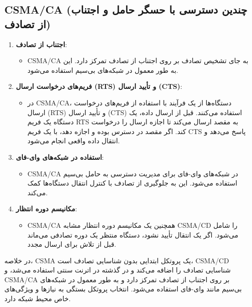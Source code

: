\subsection*{CSMA/CA (چندین دسترسی با حسگر حامل و اجتناب از تصادف)}

\begin{enumerate}
    \item \textbf{اجتناب از تصادف}:
    \begin{itemize}
        \item CSMA/CA به جای تشخیص تصادف بر روی اجتناب از تصادف تمرکز دارد. این به طور معمول در شبکه‌های بی‌سیم استفاده می‌شود.
    \end{itemize}
    
    \item \textbf{فریم‌های درخواست ارسال (RTS) و تأیید ارسال (CTS)}:
    \begin{itemize}
        \item در CSMA/CA، دستگاه‌ها از یک فرآیند با استفاده از فریم‌های درخواست ارسال (RTS) و تأیید ارسال (CTS) استفاده می‌کنند. قبل از ارسال داده، یک دستگاه یک فریم RTS به مقصد ارسال می‌کند تا اجازه ارسال را درخواست کند. اگر مقصد در دسترس بوده و اجازه دهد، با یک فریم CTS پاسخ می‌دهد و انتقال داده واقعی انجام می‌شود.
    \end{itemize}
    
    \item \textbf{استفاده در شبکه‌های وای-فای}:
    \begin{itemize}
        \item CSMA/CA در شبکه‌های وای-فای برای مدیریت دسترسی به حامل بی‌سیم استفاده می‌شود. این به جلوگیری از تصادف با کنترل انتقال دستگاه‌ها کمک می‌کند.
    \end{itemize}
    
    \item \textbf{مکانیسم دوره انتظار}:
    \begin{itemize}
        \item CSMA/CA همچنین یک مکانیسم دوره انتظار مشابه CSMA/CD را شامل می‌شود. اگر یک انتقال تأیید نشود، دستگاه منتظر یک دوره تصادفی می‌ماند قبل از تلاش برای ارسال مجدد.
    \end{itemize}
\end{enumerate}

در خلاصه، CSMA یک پروتکل ابتدایی بدون شناسایی تصادف است، CSMA/CD شناسایی تصادف را اضافه می‌کند و در گذشته در اترنت سنتی استفاده می‌شد، و CSMA/CA بر روی اجتناب از تصادف تمرکز دارد و به طور معمول در شبکه‌های بی‌سیم مانند وای-فای استفاده می‌شود. انتخاب پروتکل بستگی به نیازها و ویژگی‌های خاص محیط شبکه دارد.


